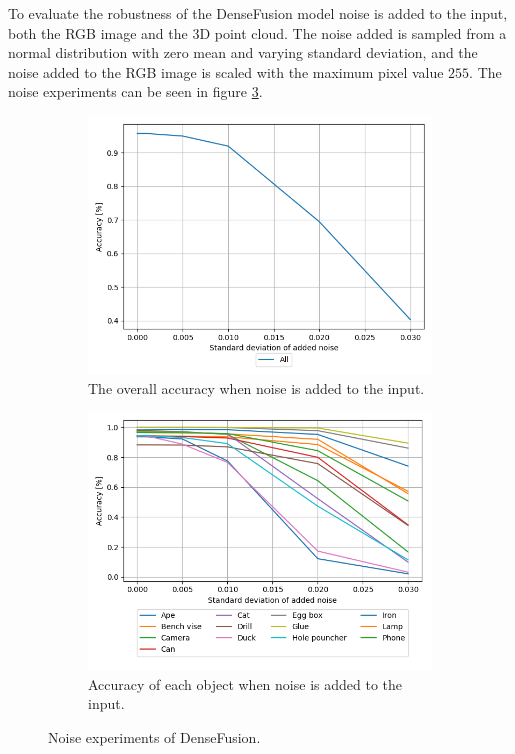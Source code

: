 \documentclass[../main.tex]{subfiles}
\begin{document}
To evaluate the robustness of the DenseFusion model noise is added to the input, both the RGB image and the 3D point cloud. The noise added is sampled from a normal distribution with zero mean and varying standard deviation, and the noise added to the RGB image is scaled with the maximum pixel value $255$. The noise experiments can be seen in figure \ref{fig:noise_experiments}.
\begin{figure}[H]
    \centering
    \begin{subfigure}[t]{0.49\textwidth}
        \centering
        \captionsetup{width=.9\textwidth}
        \includegraphics[width=\textwidth]{figures/dense_fusion/acc_all.png}
        \caption{The overall accuracy when noise is added to the input.}
        \label{subfig:noise_all}
    \end{subfigure}
    \begin{subfigure}[t]{0.49\textwidth}
        \centering
        \captionsetup{width=\textwidth}
        \includegraphics[width=\textwidth]{figures/dense_fusion/acc_objs.png}
        \caption{Accuracy of each object when noise is added to the input.}
        \label{subfig:noise_objects}
    \end{subfigure}
    \caption{Noise experiments of DenseFusion.}
    \label{fig:noise_experiments}
\end{figure}
\end{document}
